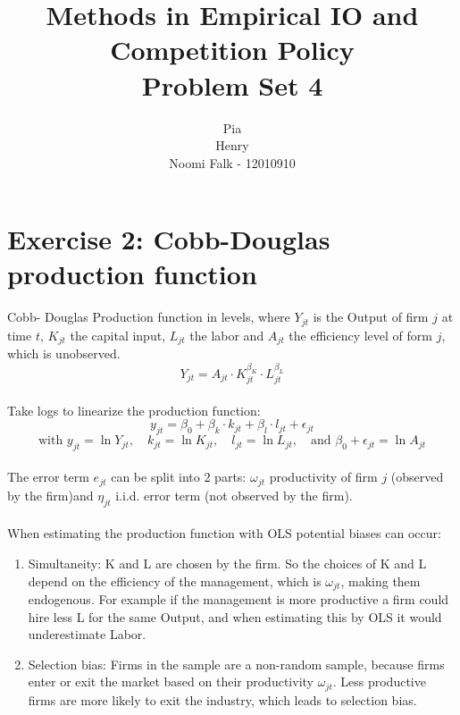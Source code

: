 \documentclass{article}
\title{Methods in Empirical IO and Competition Policy \\ Problem Set 4 }
\author{Pia\\ Henry\\Noomi Falk - 12010910 }
\date{}
\begin{document}
\maketitle

\section*{Exercise 2: Cobb-Douglas production function}
Cobb- Douglas Production function in levels, where $Y_{jt}$ is the Output of firm $j$ at time $t$, $K_{jt}$ the capital input, $L_{jt}$ the labor and $A_{jt}$ the efficiency level of form $j$, which is unobserved.\\
\[Y_{jt} = A_{jt} \cdot K_{jt}^{\beta_K} \cdot L_{jt}^{\beta_L}\]\\
Take logs to linearize the production function:
\[y_{jt} = \beta_0 + \beta_k \cdot k_{jt} + \beta_l \cdot l_{jt} + \epsilon_{jt}\]
\[\text{with } y_{jt} = \ln Y_{jt},\quad k_{jt} = \ln K_{jt},\quad l_{jt} = \ln L_{jt},\quad \text{and } \beta_0 + \epsilon_{jt} = \ln A_{jt}\]\\
The error term $e_{jt}$ can be split into 2 parts: $\omega_{jt}$ productivity of firm $j$ (observed by the firm)and $\eta_{jt}$ i.i.d. error term (not observed by the firm).\\
\\
When estimating the production function with OLS potential biases can occur:
\begin{enumerate}
    \item Simultaneity: K and L are chosen by the firm. So the choices of K and L depend on the efficiency of the management, which is $\omega_{jt}$, making them endogenous. For example if the management is more productive a firm could hire less L for the same Output, and when estimating this by OLS it would underestimate Labor. 
    \item Selection bias: Firms in the sample are a non-random sample, because firms enter or exit the market based on their productivity $\omega_{jt}$. Less productive firms are more likely to exit the industry, which leads to selection bias.
\end{enumerate}
\newpage
\end{document}
